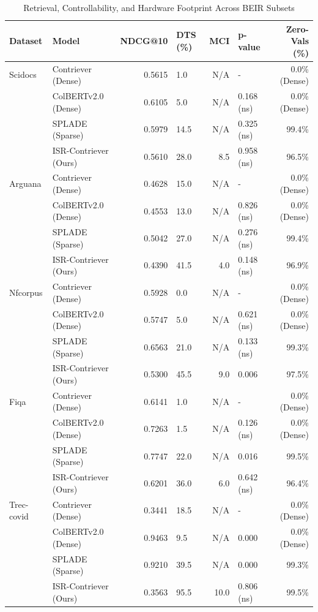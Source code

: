 \documentclass[sigconf,authordraft]{acmart}
\begin{document}
\begin{table}[htbp]
\centering
\caption{Retrieval, Controllability, and Hardware Footprint Across BEIR Subsets}
\label{tab:beir_results}
\begin{tabular}{llrlrlr}
\toprule
Dataset & Model & NDCG@10 & DTS (\%) & MCI & p-value & Zero-Vals (\%) \\
\midrule
Scidocs & Contriever (Dense) & 0.5615 & 1.0 & N/A & - & 0.0\% (Dense) \\
& ColBERTv2.0 (Dense) & 0.6105 & 5.0 & N/A & 0.168 (ns) & 0.0\% (Dense) \\
& SPLADE (Sparse) & 0.5979 & 14.5 & N/A & 0.325 (ns) & 99.4\% \\
& ISR-Contriever (Ours) & 0.5610 & 28.0 & 8.5 & 0.958 (ns) & 96.5\% \\
\midrule
Arguana & Contriever (Dense) & 0.4628 & 15.0 & N/A & - & 0.0\% (Dense) \\
& ColBERTv2.0 (Dense) & 0.4553 & 13.0 & N/A & 0.826 (ns) & 0.0\% (Dense) \\
& SPLADE (Sparse) & 0.5042 & 27.0 & N/A & 0.276 (ns) & 99.4\% \\
& ISR-Contriever (Ours) & 0.4390 & 41.5 & 4.0 & 0.148 (ns) & 96.9\% \\
\midrule
Nfcorpus & Contriever (Dense) & 0.5928 & 0.0 & N/A & - & 0.0\% (Dense) \\
& ColBERTv2.0 (Dense) & 0.5747 & 5.0 & N/A & 0.621 (ns) & 0.0\% (Dense) \\
& SPLADE (Sparse) & 0.6563 & 21.0 & N/A & 0.133 (ns) & 99.3\% \\
& ISR-Contriever (Ours) & 0.5300 & 45.5 & 9.0 & 0.006 & 97.5\% \\
\midrule
Fiqa & Contriever (Dense) & 0.6141 & 1.0 & N/A & - & 0.0\% (Dense) \\
& ColBERTv2.0 (Dense) & 0.7263 & 1.5 & N/A & 0.126 (ns) & 0.0\% (Dense) \\
& SPLADE (Sparse) & 0.7747 & 22.0 & N/A & 0.016 & 99.5\% \\
& ISR-Contriever (Ours) & 0.6201 & 36.0 & 6.0 & 0.642 (ns) & 96.4\% \\
\midrule
Trec-covid & Contriever (Dense) & 0.3441 & 18.5 & N/A & - & 0.0\% (Dense) \\
& ColBERTv2.0 (Dense) & 0.9463 & 9.5 & N/A & 0.000 & 0.0\% (Dense) \\
& SPLADE (Sparse) & 0.9210 & 39.5 & N/A & 0.000 & 99.3\% \\
& ISR-Contriever (Ours) & 0.3563 & 95.5 & 10.0 & 0.806 (ns) & 99.5\% \\
\bottomrule
\end{tabular}
\end{table}
\end{document}
